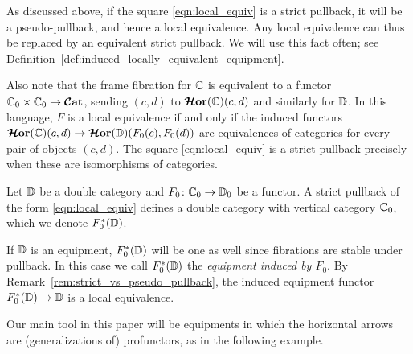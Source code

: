 \documentclass[11pt,oneside,article]{memoir}
\begin{document}
\begin{remark}
    \label{rem:strict_vs_pseudo_pullback}
  As discussed above, if the square \eqref{eqn:local_equiv} is a strict pullback, it will be a
  pseudo-pullback, and hence a local equivalence. Any local equivalence can thus be replaced by
  an equivalent strict pullback. We will use this fact often; see 
  Definition~\ref{def:induced_locally_equivalent_equipment}.

  Also note that the frame fibration for $\mathbb{C}$ is equivalent to a functor
  $\mathbb{C}_0\times\mathbb{C}_0\to\bm{\mathcal{C}}\mathbf{at}$, sending $(c,d)$ to
  $\bm{\mathcal{H}}\mathbf{or}(\mathbb{C})(c,d)$ and similarly for $\mathbb{D}$. In this language, $F$ is a local equivalence
  if and only if the induced functors $\bm{\mathcal{H}}\mathbf{or}(\mathbb{C})(c,d)\to\bm{\mathcal{H}}\mathbf{or}(\mathbb{D})(F_0(c),F_0(d))$ are
  equivalences of categories for every pair of objects $(c,d)$. The square \eqref{eqn:local_equiv}
  is a strict pullback precisely when these are isomorphisms of categories.
\end{remark}

\begin{definition}
    \label{def:induced_locally_equivalent_equipment}
  Let $\mathbb{D}$ be a double category and $F_0\colon\mathbb{C}_0\to\mathbb{D}_0$ be a functor. A strict
  pullback of the form \eqref{eqn:local_equiv} defines a double category with vertical category $\mathbb{C}_0$, which we denote $F_0^*(\mathbb{D})$.
  
  If $\mathbb{D}$ is an equipment, $F_0^*(\mathbb{D})$ will be one as well since fibrations are stable under
  pullback. In this case we call $F_0^*(\mathbb{D})$ the \emph{equipment induced by $F_0$}. By
  Remark~\ref{rem:strict_vs_pseudo_pullback}, the induced equipment functor
  $F_0^*(\mathbb{D})\to\mathbb{D}$ is a local equivalence.
\end{definition}

Our main tool in this paper will be equipments in which the horizontal arrows are (generalizations
of) profunctors, as in the following example.
\end{document}
